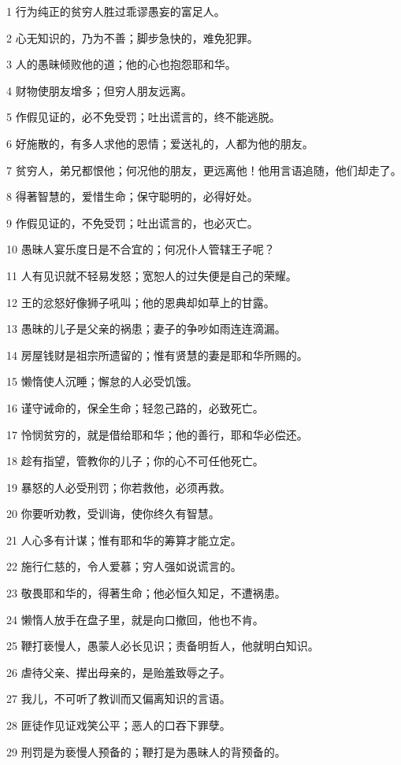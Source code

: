 \par 1 行为纯正的贫穷人胜过乖谬愚妄的富足人。
\par 2 心无知识的，乃为不善；脚步急快的，难免犯罪。
\par 3 人的愚昧倾败他的道；他的心也抱怨耶和华。
\par 4 财物使朋友增多；但穷人朋友远离。
\par 5 作假见证的，必不免受罚；吐出谎言的，终不能逃脱。
\par 6 好施散的，有多人求他的恩情；爱送礼的，人都为他的朋友。
\par 7 贫穷人，弟兄都恨他；何况他的朋友，更远离他！他用言语追随，他们却走了。
\par 8 得著智慧的，爱惜生命；保守聪明的，必得好处。
\par 9 作假见证的，不免受罚；吐出谎言的，也必灭亡。
\par 10 愚昧人宴乐度日是不合宜的；何况仆人管辖王子呢？
\par 11 人有见识就不轻易发怒；宽恕人的过失便是自己的荣耀。
\par 12 王的忿怒好像狮子吼叫；他的恩典却如草上的甘露。
\par 13 愚昧的儿子是父亲的祸患；妻子的争吵如雨连连滴漏。
\par 14 房屋钱财是祖宗所遗留的；惟有贤慧的妻是耶和华所赐的。
\par 15 懒惰使人沉睡；懈怠的人必受饥饿。
\par 16 谨守诫命的，保全生命；轻忽己路的，必致死亡。
\par 17 怜悯贫穷的，就是借给耶和华；他的善行，耶和华必偿还。
\par 18 趁有指望，管教你的儿子；你的心不可任他死亡。
\par 19 暴怒的人必受刑罚；你若救他，必须再救。
\par 20 你要听劝教，受训诲，使你终久有智慧。
\par 21 人心多有计谋；惟有耶和华的筹算才能立定。
\par 22 施行仁慈的，令人爱慕；穷人强如说谎言的。
\par 23 敬畏耶和华的，得著生命；他必恒久知足，不遭祸患。
\par 24 懒惰人放手在盘子里，就是向口撤回，他也不肯。
\par 25 鞭打亵慢人，愚蒙人必长见识；责备明哲人，他就明白知识。
\par 26 虐待父亲、撵出母亲的，是贻羞致辱之子。
\par 27 我儿，不可听了教训而又偏离知识的言语。
\par 28 匪徒作见证戏笑公平；恶人的口吞下罪孽。
\par 29 刑罚是为亵慢人预备的；鞭打是为愚昧人的背预备的。


